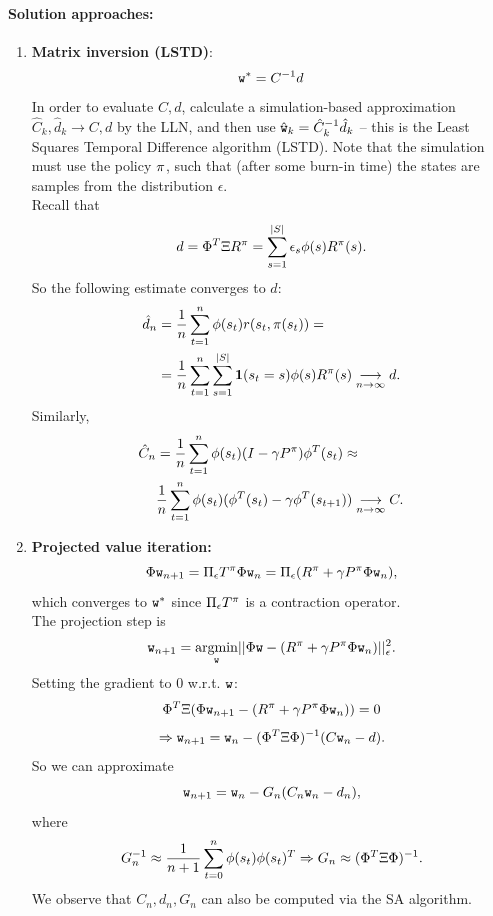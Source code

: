 \paragraph{Solution approaches:}
\begin{enumerate}\negspace
\item \textbf{Matrix inversion (LSTD)}: $$\texttt{w}^* = C^{-1}d$$
In order to evaluate $C,d$, calculate a simulation-based approximation $\hat{C}_k,\hat{d}_k \rightarrow C,d$ by the LLN, and then use $\hat{\texttt{w}}_k = \hat{C}_k^{-1} \hat{d}_k$ -- this is the Least Squares Temporal Difference algorithm (LSTD). Note that the simulation must use the policy $\pi$, such that (after some burn-in time) the states are samples from the distribution $\epsilon$.\\
Recall that
$$d = \Phi^T \Xi R^\pi = \sum_{s=1}^{|S|} \epsilon_s  {\phi}(s) R^\pi(s).$$
So the following estimate converges to $d$:
\begin{align*}
\hat{d}_n &= \frac{1}{n} \sum_{t=1}^n  {\phi}(s_t) r(s_t,\pi(s_t)) = \\
&= \frac{1}{n}\sum_{t=1}^n\sum_{s=1}^{|S|} {\bf1}(s_t=s) {\phi}(s) R^\pi(s) \underset{n\rightarrow \infty}{\longrightarrow} d .
\end{align*}
Similarly,
\begin{align*}
\hat{C}_n &= \frac{1}{n} \sum_{t=1}^n  {\phi}(s_t)(I-\gamma P^\pi) {\phi}^T(s_t) \approx \\
&\frac{1}{n} \sum_{t=1}^n {\phi}(s_t)( {\phi}^T(s_t)-\gamma {\phi}^T(s_{t+1}))  \underset{n\rightarrow \infty}{\longrightarrow} C .
\end{align*}

\item \textbf{Projected value iteration:}
$$\Phi \texttt{w}_{n+1} = \Pi_\epsilon T^\pi \Phi \texttt{w}_n = \Pi_\epsilon(R^\pi+\gamma P^\pi \Phi \texttt{w}_n),$$
which converges to $\texttt{w}^*$ since $\Pi_\epsilon T^\pi$ is a contraction operator.\\

The projection step is
$$ \texttt{w}_{n+1} = \underset{\texttt{w}}{\operatorname{argmin}}||\Phi \texttt{w} - (R^\pi+\gamma P^\pi \Phi \texttt{w}_n)||_\epsilon^2.$$
Setting the gradient to $0$ w.r.t. $\texttt{w}$:
$$\Phi^T \Xi(\Phi \texttt{w}_{n+1} - (R^\pi+\gamma P^\pi \Phi \texttt{w}_n)) = 0$$
$$\Rightarrow \texttt{w}_{n+1} = \texttt{w}_n - (\Phi^T\Xi\Phi)^{-1}(C \texttt{w}_n-d).$$
So we can approximate
$$\texttt{w}_{n+1} = \texttt{w}_n - G_n(C_n \texttt{w}_n -d_n),$$
where
$$G_n^{-1} \approx \frac{1}{n+1} \sum_{t=0}^n  {\phi}(s_t) {\phi}(s_t)^T \Rightarrow G_n \approx (\Phi^T \Xi \Phi)^{-1}.$$
We observe that $C_n,d_n,G_n$ can also be computed via the SA algorithm.


\end{enumerate}
